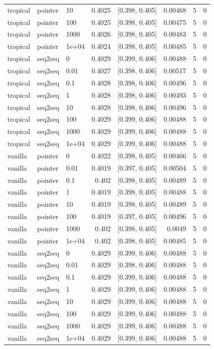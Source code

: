 \documentclass[10pt]{article}
\begin{document}
{\begin{longtable}{lllrlrrr}
tropical & pointer & 10 & 0.4025 & [0.398, 0.405] & 0.00468 & 5 & 0\\
tropical & pointer & 100 & 0.4025 & [0.398, 0.405] & 0.00475 & 5 & 0\\
tropical & pointer & 1000 & 0.4026 & [0.398, 0.405] & 0.00483 & 5 & 0\\
tropical & pointer & 1e+04 & 0.4024 & [0.398, 0.405] & 0.00485 & 5 & 0\\
tropical & seq2seq & 0 & 0.4029 & [0.399, 0.406] & 0.00488 & 5 & 0\\
tropical & seq2seq & 0.01 & 0.4027 & [0.398, 0.406] & 0.00517 & 5 & 0\\
tropical & seq2seq & 0.1 & 0.4028 & [0.398, 0.406] & 0.00496 & 5 & 0\\
tropical & seq2seq & 1 & 0.4028 & [0.398, 0.406] & 0.00493 & 5 & 0\\
tropical & seq2seq & 10 & 0.4028 & [0.398, 0.406] & 0.00496 & 5 & 0\\
tropical & seq2seq & 100 & 0.4029 & [0.399, 0.406] & 0.00488 & 5 & 0\\
tropical & seq2seq & 1000 & 0.4029 & [0.399, 0.406] & 0.00488 & 5 & 0\\
tropical & seq2seq & 1e+04 & 0.4029 & [0.399, 0.406] & 0.00488 & 5 & 0\\
vanilla & pointer & 0 & 0.4022 & [0.398, 0.405] & 0.00466 & 5 & 0\\
vanilla & pointer & 0.01 & 0.4019 & [0.397, 0.405] & 0.00504 & 5 & 0\\
vanilla & pointer & 0.1 & 0.402 & [0.398, 0.405] & 0.00489 & 5 & 0\\
vanilla & pointer & 1 & 0.4019 & [0.398, 0.405] & 0.00488 & 5 & 0\\
vanilla & pointer & 10 & 0.4019 & [0.398, 0.405] & 0.00489 & 5 & 0\\
vanilla & pointer & 100 & 0.4019 & [0.397, 0.405] & 0.00496 & 5 & 0\\
vanilla & pointer & 1000 & 0.402 & [0.398, 0.405] & 0.0049 & 5 & 0\\
vanilla & pointer & 1e+04 & 0.402 & [0.398, 0.405] & 0.00485 & 5 & 0\\
vanilla & seq2seq & 0 & 0.4029 & [0.399, 0.406] & 0.00488 & 5 & 0\\
vanilla & seq2seq & 0.01 & 0.4029 & [0.398, 0.406] & 0.00488 & 5 & 0\\
vanilla & seq2seq & 0.1 & 0.4029 & [0.399, 0.406] & 0.00488 & 5 & 0\\
vanilla & seq2seq & 1 & 0.4029 & [0.399, 0.406] & 0.00488 & 5 & 0\\
vanilla & seq2seq & 10 & 0.4029 & [0.399, 0.406] & 0.00488 & 5 & 0\\
vanilla & seq2seq & 100 & 0.4029 & [0.399, 0.406] & 0.00488 & 5 & 0\\
vanilla & seq2seq & 1000 & 0.4029 & [0.399, 0.406] & 0.00488 & 5 & 0\\
vanilla & seq2seq & 1e+04 & 0.4029 & [0.399, 0.406] & 0.00488 & 5 & 0\\
\bottomrule
\end{longtable}
}
\end{document}

